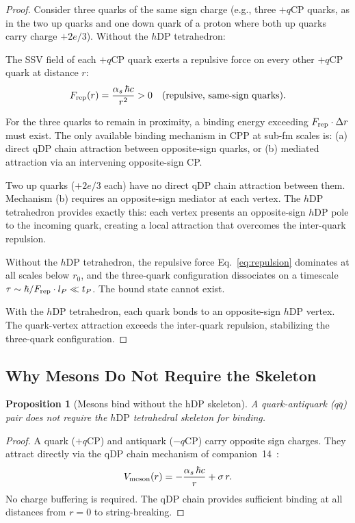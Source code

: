 \documentclass[12pt]{article}
\newtheorem{proposition}[theorem]{Proposition}
\newcommand{\qCP}{q\mathrm{CP}}
\newcommand{\hDP}{h\mathrm{DP}}
\newcommand{\as}{\alpha_s}
\begin{document}
\begin{proof}
Consider three quarks of the same sign charge (e.g., three $+\qCP$
quarks, as in the two up quarks and one down quark of a proton where
both up quarks carry charge $+2e/3$).  Without the $\hDP$ tetrahedron:

The SSV field of each $+\qCP$ quark exerts a repulsive force on every
other $+\qCP$ quark at distance $r$:
\begin{equation}
F_{\rm rep}(r) = \frac{\as\,\hbar c}{r^2} > 0
\quad \text{(repulsive, same-sign quarks)}.
\label{eq:repulsion}
\end{equation}

For the three quarks to remain in proximity, a binding energy
exceeding $F_{\rm rep} \cdot \Delta r$ must exist.  The only
available binding mechanism in CPP at sub-fm scales is:
(a) direct qDP chain attraction between opposite-sign quarks, or
(b) mediated attraction via an intervening opposite-sign CP.

Two up quarks ($+2e/3$ each) have no direct qDP chain attraction
between them.  Mechanism (b) requires an opposite-sign mediator
at each vertex.  The $\hDP$ tetrahedron provides exactly this:
each vertex presents an opposite-sign $\hDP$ pole to the incoming
quark, creating a local attraction that overcomes the inter-quark
repulsion.

Without the $\hDP$ tetrahedron, the repulsive force
Eq.~\eqref{eq:repulsion} dominates at all scales below $r_0$, and
the three-quark configuration dissociates on a timescale
$\tau \sim \hbar / F_{\rm rep} \cdot l_P \ll t_P$.  The bound
state cannot exist.

With the $\hDP$ tetrahedron, each quark bonds to an opposite-sign
$\hDP$ vertex.  The quark-vertex attraction exceeds the inter-quark
repulsion, stabilizing the three-quark configuration.
\end{proof}

\subsection{Why Mesons Do Not Require the Skeleton}

\begin{proposition}[Mesons bind without the hDP skeleton]
\label{prop:meson_no_skeleton}
A quark-antiquark ($q\bar{q}$) pair does not require the $\hDP$
tetrahedral skeleton for binding.
\end{proposition}

\begin{proof}
A quark ($+\qCP$) and antiquark ($-\qCP$) carry opposite sign charges.
They attract directly via the qDP chain mechanism of companion~14~\cite{c14}:
\begin{equation}
V_{\rm meson}(r) = -\frac{\as\,\hbar c}{r} + \sigma\,r.
\label{eq:meson_potential}
\end{equation}
No charge buffering is required.  The qDP chain provides sufficient
binding at all distances from $r = 0$ to string-breaking.
\end{proof}
\end{document}
